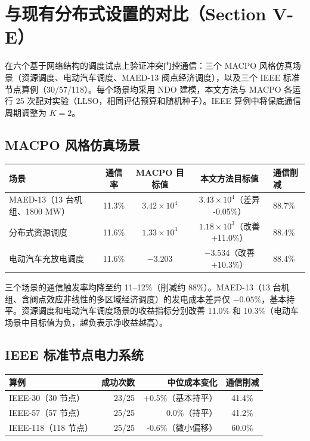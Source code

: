 \documentclass[11pt,a4paper]{ctexart}
\begin{document}
\section{与现有分布式设置的对比（Section V-E）}

在六个基于网络结构的调度试点上验证冲突门控通信：三个 MACPO 风格仿真场景（资源调度、电动汽车调度、MAED-13 阀点经济调度），以及三个 IEEE 标准节点算例（30/57/118）。每个场景均采用 NDO 建模，本文方法与 MACPO 各运行 25 次配对实验（LLSO，相同评估预算和随机种子）。IEEE 算例中将保底通信周期调整为 $K=2$。

\subsection{MACPO 风格仿真场景}

\begin{center}\small
\begin{tabular}{@{}p{2.8cm}cccp{2.5cm}@{}}
\toprule
场景 & 通信率 & MACPO 目标值 & 本文方法目标值 & 通信削减 \\
\midrule
MAED-13（13 台机组、1800 MW） & 11.3\% & $3.42\times10^4$ & $3.43\times10^4$（差异 -0.05\%） & 88.7\% \\
分布式资源调度 & 11.6\% & $1.33\times10^3$ & $1.18\times10^3$（改善 +11.0\%） & 88.4\% \\
电动汽车充放电调度 & 11.6\% & $-3.203$ & $-3.534$（改善 +10.3\%） & 88.4\% \\
\bottomrule
\end{tabular}
\end{center}

三个场景的通信触发率均降至约 11--12\%（削减约 88\%）。MAED-13（13 台机组、含阀点效应非线性的多区域经济调度）的发电成本差异仅 $-0.05\%$，基本持平。资源调度和电动汽车调度场景的收益指标分别改善 11.0\% 和 10.3\%（电动车场景中目标值为负，越负表示净收益越高）。

\subsection{IEEE 标准节点电力系统}

\begin{center}\small
\begin{tabular}{@{}lrrc@{}}
\toprule
算例 & 成功次数 & 中位成本变化 & 通信削减 \\
\midrule
IEEE-30（30 节点） & 23/25 & +0.5\%（基本持平） & 41.4\% \\
IEEE-57（57 节点） & 25/25 & 0.0\%（持平） & 41.2\% \\
IEEE-118（118 节点） & 25/25 & -0.6\%（微小偏移） & 60.0\% \\
\bottomrule
\end{tabular}
\end{center}
\end{document}
